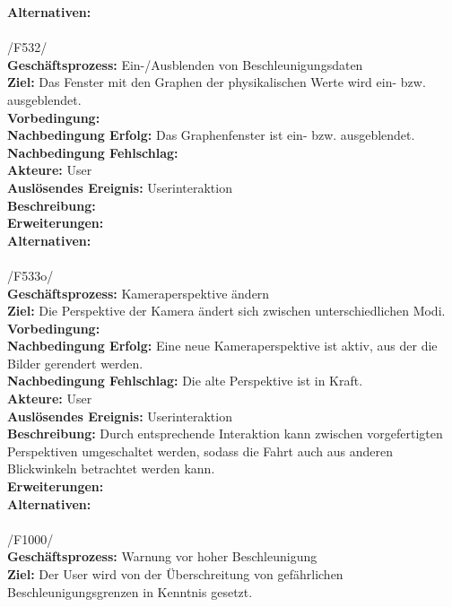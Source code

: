 \textbf{Alternativen:}\\
\\
/F532/\\
\textbf{Geschäftsprozess:} Ein-/Ausblenden von Beschleunigungsdaten\\
\textbf{Ziel:} Das Fenster mit den Graphen der physikalischen Werte wird ein- bzw. ausgeblendet.\\
\textbf{Vorbedingung:} \\
\textbf{Nachbedingung Erfolg:} Das Graphenfenster ist ein- bzw. ausgeblendet.\\
\textbf{Nachbedingung Fehlschlag:}\\ 
\textbf{Akteure:} User\\
\textbf{Auslösendes Ereignis:} Userinteraktion\\
\textbf{Beschreibung:} \\
\textbf{Erweiterungen:}\\
\textbf{Alternativen:}\\
\\
/F533o/\\
\textbf{Geschäftsprozess:} Kameraperspektive ändern\\
\textbf{Ziel:} Die Perspektive der Kamera ändert sich zwischen unterschiedlichen Modi.\\
\textbf{Vorbedingung:} \\
\textbf{Nachbedingung Erfolg:} Eine neue Kameraperspektive ist aktiv, aus der die Bilder gerendert werden.\\
\textbf{Nachbedingung Fehlschlag:} Die alte Perspektive ist in Kraft.\\
\textbf{Akteure:} User\\
\textbf{Auslösendes Ereignis:} Userinteraktion\\
\textbf{Beschreibung:} Durch entsprechende Interaktion kann zwischen vorgefertigten Perspektiven umgeschaltet werden, sodass die Fahrt auch aus anderen Blickwinkeln betrachtet werden kann.\\
\textbf{Erweiterungen:}\\
\textbf{Alternativen:}\\
\\
/F1000/\\
\textbf{Geschäftsprozess:} Warnung vor hoher Beschleunigung\\
\textbf{Ziel:} Der User wird von der Überschreitung von gefährlichen Beschleunigungsgrenzen in Kenntnis gesetzt.\\
